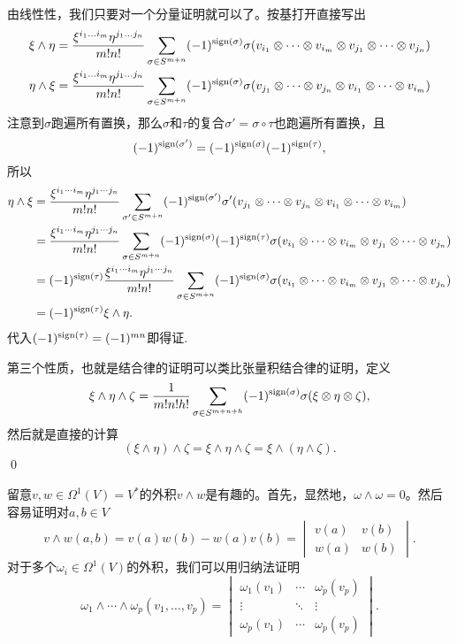 	由线性性，我们只要对一个分量证明就可以了。按基打开直接写出
	\[
		\begin{split}
			\xi \wedge \eta&=\frac{\xi^{i_1\dots i_m}\eta^{j_1 \dots j_n}}{m!n!}\sum_{\sigma\in S^{m+n}}(-1)^{\operatorname{sign}(\sigma)}\sigma(v_{i_1}\otimes \cdots \otimes v_{i_m}\otimes v_{j_1}\otimes \cdots \otimes v_{j_n})\\
			\eta \wedge \xi&=\frac{\xi^{i_1\dots i_m}\eta^{j_1 \dots j_n}}{m!n!}\sum_{\sigma\in S^{m+n}}(-1)^{\operatorname{sign}(\sigma)}\sigma(v_{j_1}\otimes \cdots \otimes v_{j_n}\otimes v_{i_1}\otimes \cdots \otimes v_{i_m})
		\end{split}
	\]
	注意到$\sigma$跑遍所有置换，那么$\sigma$和$\tau$的复合$\sigma'=\sigma\circ\tau$也跑遍所有置换，且
	\[(-1)^{\operatorname{sign}(\sigma')}=(-1)^{\operatorname{sign}(\sigma)}(-1)^{\operatorname{sign}(\tau)},\]所以
	\[
		\begin{split}
			\eta \wedge \xi&=\frac{\xi^{i_1\cdots i_m}\eta^{j_1 \cdots j_n}}{m!n!}\sum_{\sigma'\in S^{m+n}}(-1)^{\operatorname{sign}(\sigma')}\sigma'(v_{j_1}\otimes \cdots \otimes v_{j_n}\otimes v_{i_1}\otimes \cdots \otimes v_{i_m})\\
			&=\frac{\xi^{i_1\cdots i_m}\eta^{j_1 \cdots j_n}}{m!n!}\sum_{\sigma\in S^{m+n}}(-1)^{\operatorname{sign}(\sigma)}(-1)^{\operatorname{sign}(\tau)}\sigma(v_{i_1}\otimes \cdots \otimes v_{i_m}\otimes v_{j_1}\otimes \cdots \otimes v_{j_n})\\
			&=(-1)^{\operatorname{sign}(\tau)}\frac{\xi^{i_1\cdots i_m}\eta^{j_1 \cdots j_n}}{m!n!}\sum_{\sigma\in S^{m+n}}(-1)^{\operatorname{sign}(\sigma)}\sigma(v_{i_1}\otimes \cdots \otimes v_{i_m}\otimes v_{j_1}\otimes \cdots \otimes v_{j_n})\\
			&=(-1)^{\operatorname{sign}(\tau)} \xi \wedge \eta.
		\end{split}
	\]
	代入$(-1)^{\operatorname{sign}(\tau)}=(-1)^{mn}$即得证.

	第三个性质，也就是结合律的证明可以类比张量积结合律的证明，定义
	\[
		\xi \wedge \eta\wedge \zeta=\frac{1}{m!n!h!}\sum_{\sigma\in S^{m+n+h}}(-1)^{\operatorname{sign}(\sigma)}\sigma(\xi \otimes \eta \otimes \zeta),
	\]
	然后就是直接的计算
	\[
		(\xi \wedge \eta) \wedge \zeta=\xi \wedge \eta\wedge \zeta=\xi \wedge (\eta \wedge \zeta).
	\]
	\qed

\para 留意$v,w\in \Omega^1(V)=V^*$的外积$v\wedge w$是有趣的。首先，显然地，$\omega\wedge\omega=0$。然后容易证明对$a,b\in V$
\[
	v\wedge w(a,b)=v(a)w(b)- w(a)v(b)=\begin{vmatrix}v(a)&v(b)\\w(a)&w(b)\end{vmatrix}.
\]
对于多个$\omega_i \in \Omega^1(V)$的外积，我们可以用归纳法证明
\[
	\omega_1\wedge \cdots \wedge\omega_p(v_1,\dots,v_p)=
	\begin{vmatrix}
		\omega_1(v_1)&\cdots&\omega_p(v_p)\\
		\vdots&\ddots&\vdots\\
		\omega_p(v_1)&\cdots&\omega_p(v_p)
	\end{vmatrix}.
\]

